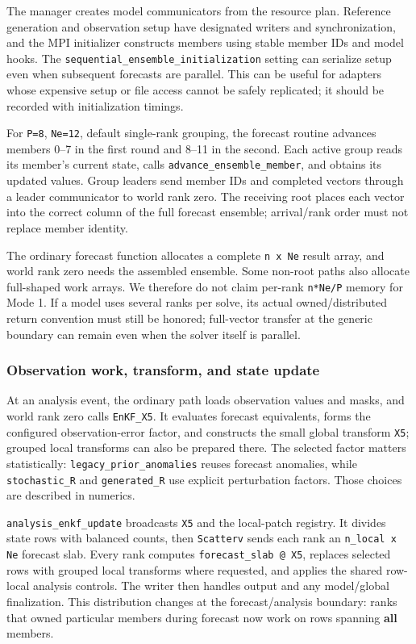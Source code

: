 \documentclass[11pt,a4paper]{article}
\newcommand{\code}[1]{\nolinkurl{#1}}
\begin{document}
The manager creates model communicators from the resource plan. Reference generation and observation setup have designated writers and synchronization, and the MPI initializer constructs members using stable member IDs and model hooks. The \code{sequential_ensemble_initialization} setting can serialize setup even when subsequent forecasts are parallel. This can be useful for adapters whose expensive setup or file access cannot be safely replicated; it should be recorded with initialization timings.

For \code{P=8}, \code{Ne=12}, default single-rank grouping, the forecast routine advances members 0--7 in the first round and 8--11 in the second. Each active group reads its member's current state, calls \code{advance_ensemble_member}, and obtains its updated values. Group leaders send member IDs and completed vectors through a leader communicator to world rank zero. The receiving root places each vector into the correct column of the full forecast ensemble; arrival/rank order must not replace member identity.

The ordinary forecast function allocates a complete \code{n x Ne} result array, and world rank zero needs the assembled ensemble. Some non-root paths also allocate full-shaped work arrays. We therefore do not claim per-rank \code{n*Ne/P} memory for Mode 1. If a model uses several ranks per solve, its actual owned/distributed return convention must still be honored; full-vector transfer at the generic boundary can remain even when the solver itself is parallel.

\subsubsection{Observation work, transform, and state update}

At an analysis event, the ordinary path loads observation values and masks, and world rank zero calls \code{EnKF_X5}. It evaluates forecast equivalents, forms the configured observation-error factor, and constructs the small global transform \code{X5}; grouped local transforms can also be prepared there. The selected factor matters statistically: \code{legacy_prior_anomalies} reuses forecast anomalies, while \code{stochastic_R} and \code{generated_R} use explicit perturbation factors. Those choices are described in numerics.

\code{analysis_enkf_update} broadcasts \code{X5} and the local-patch registry. It divides state rows with balanced counts, then \code{Scatterv} sends each rank an \code{n_local x Ne} forecast slab. Every rank computes \code{forecast_slab @ X5}, replaces selected rows with grouped local transforms where requested, and applies the shared row-local analysis controls. The writer then handles output and any model/global finalization. This distribution changes at the forecast/analysis boundary: ranks that owned particular members during forecast now work on rows spanning \textbf{all} members.
\end{document}
